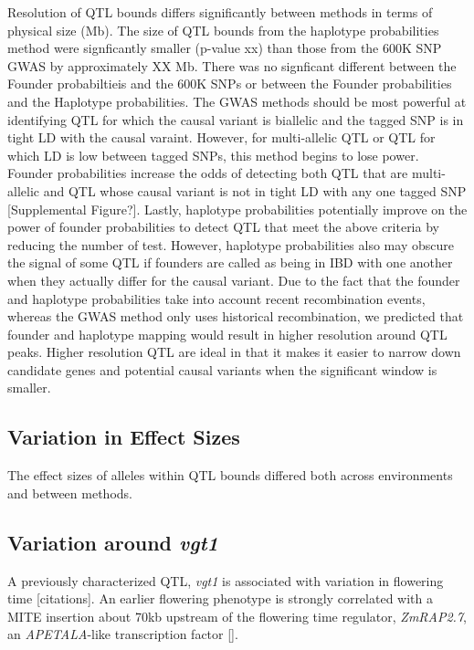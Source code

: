 \documentclass[article,9pt,twocolumn,twoside]{rilabRxiv}
\begin{document}
Resolution of QTL bounds differs significantly between methods in terms of physical size (Mb). The size of QTL bounds from the haplotype probabilities method were signficantly smaller (p-value xx) than those from the 600K SNP GWAS by approximately XX Mb. There was no signficant different between the Founder probabiltieis and the 600K SNPs or between the Founder probabilities and the Haplotype probabilities.
The GWAS methods should be most powerful at identifying QTL
for which the causal variant is biallelic and the tagged SNP is in tight LD with
the causal varaint. However, for multi-allelic QTL or QTL for which LD is low
between tagged SNPs, this method begins to lose power. Founder probabilities increase
the odds of detecting both QTL that are multi-allelic and QTL whose causal variant
is not in tight LD with any one tagged SNP [Supplemental Figure?]. Lastly,
haplotype probabilities potentially improve on the power of founder probabilities
to detect QTL that meet the above criteria by reducing the number of test. However,
haplotype probabilities also may obscure the signal of some QTL if founders are
called as being in IBD with one another when they actually differ for the causal
variant. Due to the fact that the founder and haplotype probabilities
take into account recent recombination events, whereas the GWAS method only uses
historical recombination, we predicted that founder and haplotype mapping would
result in higher resolution around QTL peaks. Higher resolution QTL are ideal in
that it makes it easier to narrow down candidate genes and potential causal variants
when the significant window is smaller.


\subsection{Variation in Effect Sizes}
The effect sizes of alleles within QTL bounds differed both across environments and between methods.

\subsection{Variation around \emph{vgt1}}
A previously characterized QTL, \emph{vgt1} is associated with variation in flowering time [citations]. An earlier flowering phenotype is strongly correlated with a MITE insertion about 70kb upstream of the flowering time regulator, \emph{ZmRAP2.7}, an \emph{APETALA}-like transcription factor [].
\end{document}
